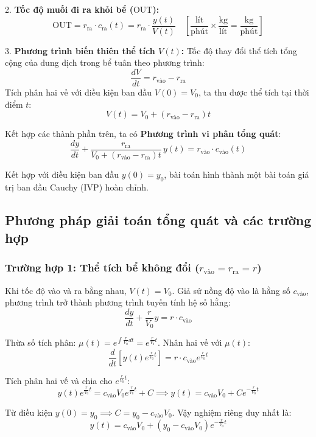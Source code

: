\documentclass[14pt]{extarticle}
\begin{document}
2. \textbf{Tốc độ muối đi ra khỏi bể ($\text{OUT}$):}
$$\text{OUT} = r_{\text{ra}} \cdot c_{\text{ra}}(t) = r_{\text{ra}} \cdot \frac{y(t)}{V(t)} \quad \left[\frac{\text{lít}}{\text{phút}} \times \frac{\text{kg}}{\text{lít}} = \frac{\text{kg}}{\text{phút}}\right]$$

3. \textbf{Phương trình biến thiên thể tích $V(t)$:}
Tốc độ thay đổi thể tích tổng cộng của dung dịch trong bể tuân theo phương trình:
$$\frac{dV}{dt} = r_{\text{vào}} - r_{\text{ra}}$$
Tích phân hai vế với điều kiện ban đầu $V(0) = V_0$, ta thu được thể tích tại thời điểm $t$:
\begin{equation}
V(t) = V_0 + (r_{\text{vào}} - r_{\text{ra}})t
\end{equation}

Kết hợp các thành phần trên, ta có \textbf{Phương trình vi phân tổng quát}:
\begin{equation}
\frac{dy}{dt} + \frac{r_{\text{ra}}}{V_0 + (r_{\text{vào}} - r_{\text{ra}})t} \, y(t) = r_{\text{vào}} \cdot c_{\text{vào}}(t)
\label{eq:master_ode}
\end{equation}

Kết hợp với điều kiện ban đầu $y(0) = y_0$, bài toán hình thành một bài toán giá trị ban đầu Cauchy (IVP) hoàn chỉnh.

\subsection{Phương pháp giải toán tổng quát và các trường hợp}

\subsubsection{Trường hợp 1: Thể tích bể không đổi ($r_{\text{vào}} = r_{\text{ra}} = r$)}
Khi tốc độ vào và ra bằng nhau, $V(t) = V_0$. Giả sử nồng độ vào là hằng số $c_{\text{vào}}$, phương trình trở thành phương trình tuyến tính hệ số hằng:
$$\frac{dy}{dt} + \frac{r}{V_0}y = r \cdot c_{\text{vào}}$$

Thừa số tích phân: $\mu(t) = e^{\int \frac{r}{V_0} dt} = e^{\frac{r}{V_0}t}$. Nhân hai vế với $\mu(t)$:
$$\frac{d}{dt}\left[y(t) e^{\frac{r}{V_0}t}\right] = r \cdot c_{\text{vào}} e^{\frac{r}{V_0}t}$$

Tích phân hai vế và chia cho $e^{\frac{r}{V_0}t}$:
$$y(t) e^{\frac{r}{V_0}t} = c_{\text{vào}}V_0 e^{\frac{r}{V_0}t} + C \implies y(t) = c_{\text{vào}}V_0 + C e^{-\frac{r}{V_0}t}$$

Từ điều kiện $y(0) = y_0 \implies C = y_0 - c_{\text{vào}}V_0$. Vậy nghiệm riêng duy nhất là:
\begin{equation}
y(t) = c_{\text{vào}}V_0 + \left(y_0 - c_{\text{vào}}V_0\right)e^{-\frac{r}{V_0}t}
\end{equation}
\end{document}

